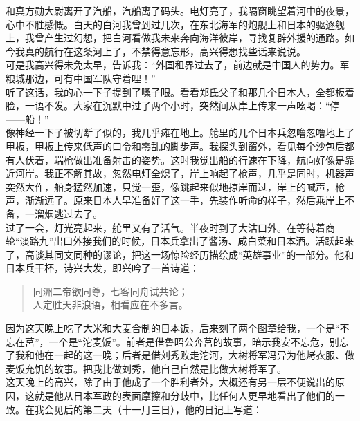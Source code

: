 和真方勋大尉离开了汽船，汽船离了码头。电灯亮了，我隔窗眺望着河中的夜景，心中不胜感慨。白天的白河我曾到过几次，在东北海军的炮舰上和日本的驱逐舰上，我曾产生过幻想，把白河看做我未来奔向海洋彼岸，寻找复辟外援的通路。如今我真的航行在这条河上了，不禁得意忘形，高兴得想找些话来说说。\\

可是我高兴得未免太早，告诉我：“外国租界过去了，前边就是中国人的势力。军粮城那边，可有中国军队守着哩！”\\

听了这话，我的心一下子提到了嗓子眼。看看郑氏父子和那几个日本人，全都板着脸，一语不发。大家在沉默中过了两个小时，突然间从岸上传来一声吆喝：“停——船！”\\

像神经一下子被切断了似的，我几乎瘫在地上。舱里的几个日本兵忽噜忽噜地上了甲板，甲板上传来低声的口令和零乱的脚步声。我探头到窗外，看见每个沙包后都有人伏着，端枪做出准备射击的姿势。这时我觉出船的行速在下降，航向好像是靠近河岸。我正不解其故，忽然电灯全熄了，岸上响起了枪声，几乎是同时，机器声突然大作，船身猛然加速，只觉一歪，像跳起来似地掠岸而过，岸上的喊声，枪声，渐渐远了。原来日本人早准备好了这一手，先装作听命的样子，然后乘岸上不备，一溜烟逃过去了。\\

过了一会，灯光亮起来，舱里又有了活气。半夜时到了大沽口外。在等待着商轮“淡路九”出口外接我们的时候，日本兵拿出了酱汤、咸白菜和日本酒。活跃起来了，高谈其同文同种的谬论，把这一场惊险经历描绘成“英雄事业”的一部分。他和日本兵干杯，诗兴大发，即兴吟了一首诗道：\\

\begin{quote}
	同洲二帝欲同尊，七客同舟试共论；\\

人定胜天非浪语，相看应在不多言。\\
\end{quote}

因为这天晚上吃了大米和大麦合制的日本饭，后来刻了两个图章给我，一个是“不忘在莒”，一个是“沱麦饭”。前者是借鲁昭公奔莒的故事，暗示我安不忘危，别忘了我和他在一起的这一晚；后者是借刘秀败走沱河，大树将军冯异为他烤衣服、做麦饭充饥的故事。把我比做刘秀，他自己自然是比做大树将军了。\\

这天晚上的高兴，除了由于他成了一个胜利者外，大概还有另一层不便说出的原因，这就是他从日本军政的表面摩擦和分歧中，比任何人更早地看出了他们的一致。在我会见后的第二天（十一月三日），他的日记上写道：\\

